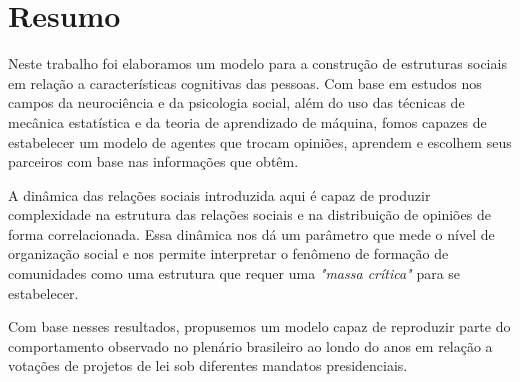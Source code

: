 
\chapter{Resumo}
\label{ch:resumo}

Neste trabalho foi elaboramos um modelo para a construção de estruturas sociais em relação a características cognitivas das pessoas.
Com base em estudos nos campos da neurociência e da psicologia social, além do uso das técnicas de mecânica estatística e da teoria de aprendizado de máquina, fomos capazes de estabelecer um modelo de agentes que trocam opiniões, aprendem e escolhem seus parceiros com base nas informações que obtêm.

A dinâmica das relações sociais introduzida aqui é capaz de produzir complexidade na estrutura das relações sociais e na distribuição de opiniões de forma correlacionada.
Essa dinâmica nos dá um parâmetro que mede o nível de organização social e nos permite interpretar o fenômeno de formação de comunidades como uma estrutura que requer uma \emph{"massa crítica"} para se estabelecer.

Com base nesses resultados, propusemos um modelo capaz de reproduzir parte do comportamento observado no plenário brasileiro ao londo do anos em relação a votações de projetos de lei sob diferentes mandatos presidenciais.
